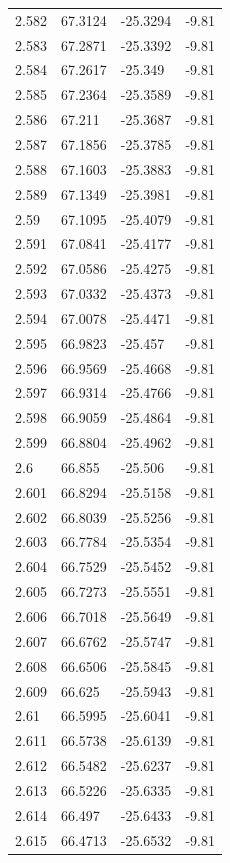 \begin{tabular}{llll}
2.582 & 67.3124 & -25.3294 & -9.81 \\
2.583 & 67.2871 & -25.3392 & -9.81 \\
2.584 & 67.2617 & -25.349 & -9.81 \\
2.585 & 67.2364 & -25.3589 & -9.81 \\
2.586 & 67.211 & -25.3687 & -9.81 \\
2.587 & 67.1856 & -25.3785 & -9.81 \\
2.588 & 67.1603 & -25.3883 & -9.81 \\
2.589 & 67.1349 & -25.3981 & -9.81 \\
2.59 & 67.1095 & -25.4079 & -9.81 \\
2.591 & 67.0841 & -25.4177 & -9.81 \\
2.592 & 67.0586 & -25.4275 & -9.81 \\
2.593 & 67.0332 & -25.4373 & -9.81 \\
2.594 & 67.0078 & -25.4471 & -9.81 \\
2.595 & 66.9823 & -25.457 & -9.81 \\
2.596 & 66.9569 & -25.4668 & -9.81 \\
2.597 & 66.9314 & -25.4766 & -9.81 \\
2.598 & 66.9059 & -25.4864 & -9.81 \\
2.599 & 66.8804 & -25.4962 & -9.81 \\
2.6 & 66.855 & -25.506 & -9.81 \\
2.601 & 66.8294 & -25.5158 & -9.81 \\
2.602 & 66.8039 & -25.5256 & -9.81 \\
2.603 & 66.7784 & -25.5354 & -9.81 \\
2.604 & 66.7529 & -25.5452 & -9.81 \\
2.605 & 66.7273 & -25.5551 & -9.81 \\
2.606 & 66.7018 & -25.5649 & -9.81 \\
2.607 & 66.6762 & -25.5747 & -9.81 \\
2.608 & 66.6506 & -25.5845 & -9.81 \\
2.609 & 66.625 & -25.5943 & -9.81 \\
2.61 & 66.5995 & -25.6041 & -9.81 \\
2.611 & 66.5738 & -25.6139 & -9.81 \\
2.612 & 66.5482 & -25.6237 & -9.81 \\
2.613 & 66.5226 & -25.6335 & -9.81 \\
2.614 & 66.497 & -25.6433 & -9.81 \\
2.615 & 66.4713 & -25.6532 & -9.81 \\

\end{tabular}
